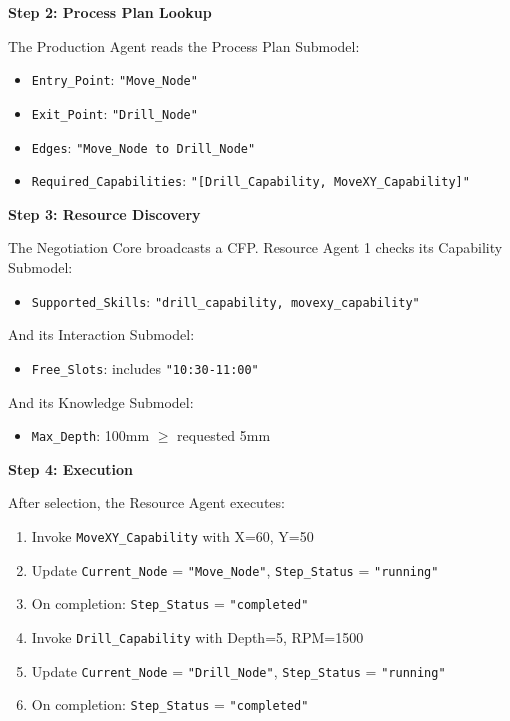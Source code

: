 \textbf{Step 2: Process Plan Lookup}

The Production Agent reads the Process Plan Submodel:
\begin{itemize}
    \item \texttt{Entry\_Point}: \texttt{"Move\_Node"}
    \item \texttt{Exit\_Point}: \texttt{"Drill\_Node"}
    \item \texttt{Edges}: \texttt{"Move\_Node to Drill\_Node"}
    \item \texttt{Required\_Capabilities}: \texttt{"[Drill\_Capability, MoveXY\_Capability]"}
\end{itemize}

\textbf{Step 3: Resource Discovery}

The Negotiation Core broadcasts a CFP. Resource Agent 1 checks its Capability Submodel:
\begin{itemize}
    \item \texttt{Supported\_Skills}: \texttt{"drill\_capability, movexy\_capability"} \checkmark
\end{itemize}

And its Interaction Submodel:
\begin{itemize}
    \item \texttt{Free\_Slots}: includes \texttt{"10:30-11:00"} \checkmark
\end{itemize}

And its Knowledge Submodel:
\begin{itemize}
    \item \texttt{Max\_Depth}: 100mm $\geq$ requested 5mm \checkmark
\end{itemize}

\textbf{Step 4: Execution}

After selection, the Resource Agent executes:
\begin{enumerate}
    \item Invoke \texttt{MoveXY\_Capability} with X=60, Y=50
    \item Update \texttt{Current\_Node} = \texttt{"Move\_Node"}, \texttt{Step\_Status} = \texttt{"running"}
    \item On completion: \texttt{Step\_Status} = \texttt{"completed"}
    \item Invoke \texttt{Drill\_Capability} with Depth=5, RPM=1500
    \item Update \texttt{Current\_Node} = \texttt{"Drill\_Node"}, \texttt{Step\_Status} = \texttt{"running"}
    \item On completion: \texttt{Step\_Status} = \texttt{"completed"}
\end{enumerate}

